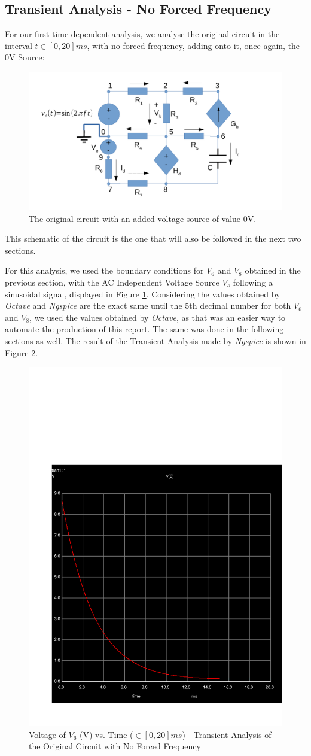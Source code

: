 \clearpage

\subsection{Transient Analysis - No Forced Frequency}

For our first time-dependent analysis, we analyse the original circuit in the interval $t \in [0, 20]ms$, with no forced frequency, adding onto it, once again, the 0V Source:

 

\begin{figure}[h] \centering
\includegraphics[width=0.7\linewidth]{t2-sim345.pdf}
\caption{The original circuit with an added voltage source of value 0V.}
\label{fig:sim345}
\end{figure}

This schematic of the circuit is the one that will also be followed in the next two sections.

For this analysis, we used the boundary conditions for $V_6$ and $V_8$ obtained in the previous section, with the AC Independent Voltage Source $V_s$ following a sinusoidal signal, displayed in Figure \ref{fig:sim345}. Considering the values obtained by \textit{Octave} and \textit{Ngspice} are the exact same until the 5th decimal number for both $V_6$ and $V_8$, we used the values obtained by \textit{Octave}, as that was an easier way to automate the production of this report. The same was done in the following sections as well. The result of the Transient Analysis made by \textit{Ngspice} is shown in Figure \ref{fig:sim-graph3}.

 

\begin{figure}[h] \centering
\includegraphics[width=0.4\linewidth]{../sim/trans3.pdf}
\caption{Voltage of $V_6$ (V) vs. Time ($\in [0, 20]ms$) - Transient Analysis of the Original Circuit with No Forced Frequency}
\label{fig:sim-graph3}
\end{figure}

